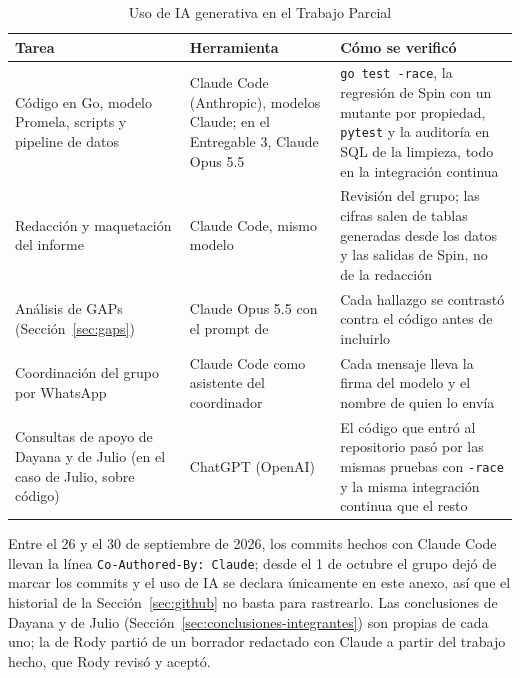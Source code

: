 \begin{table}[H]
\caption{Uso de IA generativa en el Trabajo Parcial}\label{tab:uso-ia}
\small
\begin{tabularx}{\textwidth}{@{}L{3.6cm}L{3.8cm}Y@{}}
\toprule
\textbf{Tarea} & \textbf{Herramienta} & \textbf{Cómo se verificó} \\
\midrule
Código en Go, modelo Promela, scripts y pipeline de datos & Claude Code (Anthropic), modelos
  Claude; en el Entregable 3, Claude Opus 5.5 & \texttt{go test -race}, la regresión de Spin con un
  mutante por propiedad, \texttt{pytest} y la auditoría en SQL de la limpieza, todo en la
  integración continua \\
\addlinespace
Redacción y maquetación del informe & Claude Code, mismo modelo & Revisión del grupo; las cifras
  salen de tablas generadas desde los datos y las salidas de Spin, no de la redacción \\
\addlinespace
Análisis de GAPs (Sección~\ref{sec:gaps}) & Claude Opus 5.5 con el prompt de
   & Cada hallazgo se contrastó contra el código antes de
  incluirlo \\
\addlinespace
Coordinación del grupo por WhatsApp & Claude Code como asistente del coordinador & Cada
  mensaje lleva la firma del modelo y el nombre de quien lo envía \\
\addlinespace
Consultas de apoyo de Dayana y de Julio (en el caso de Julio, sobre código) & ChatGPT (OpenAI) &
  El código que entró al repositorio pasó por las mismas pruebas con \texttt{-race} y la misma
  integración continua que el resto \\
\bottomrule
\end{tabularx}
\end{table}

Entre el 26 y el 30 de septiembre de 2026, los commits hechos con Claude Code llevan la línea
\texttt{Co-Authored-By: Claude}; desde el 1 de octubre el grupo dejó de marcar los commits y el uso
de IA se declara únicamente en este anexo, así que el historial de la Sección~\ref{sec:github} no
basta para rastrearlo. Las conclusiones de Dayana y de Julio
(Sección~\ref{sec:conclusiones-integrantes}) son propias de cada uno; la de Rody partió de un
borrador redactado con Claude a partir del trabajo hecho, que Rody revisó y aceptó.
